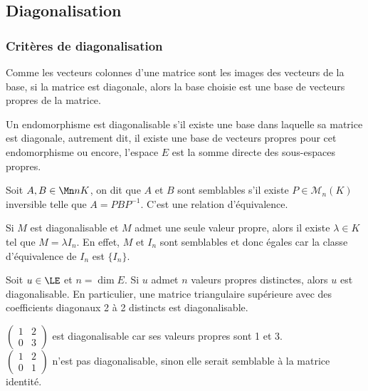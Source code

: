 \subsection{Diagonalisation}

\subsubsection{Critères de diagonalisation}

\begin{remarque}
	Comme les vecteurs colonnes d'une matrice sont les images des vecteurs de
	la base, si la matrice est diagonale, alors la base choisie est une base de
	vecteurs propres de la matrice.
\end{remarque}


\begin{definition}
	Un endomorphisme est diagonalisable s'il existe une base dans laquelle sa matrice est diagonale, autrement dit, il
	existe une base de vecteurs propres pour cet endomorphisme ou encore, l'espace $E$ est la somme directe des sous-espaces propres.
\end{definition}

\begin{rappel}
	Soit $A, B \in \Mn n K$, on dit que $A$ et $B$ sont semblables s'il existe
	$P \in \mathcal{M}_n(K)$ inversible telle que $A = PBP^{-1}$. C'est une relation d'équivalence.
\end{rappel}

\begin{exemple}
	Si $M$ est diagonalisable et $M$ admet une seule valeur propre, alors il existe $\lambda \in K$ tel que $M = \lambda I_n$.
	En effet, $M$ et $I_n$ sont semblables et donc égales car la classe d'équivalence de $I_n$ est $\{I_n\}$.
\end{exemple}



\begin{prop}
	Soit $u \in \LE$ et $n = \dim E$. Si $u$ admet $n$ valeurs propres distinctes, alors $u$ est diagonalisable.
	En particulier, une matrice triangulaire supérieure avec des coefficients diagonaux 2 à 2 distincts est diagonalisable.
\end{prop}

\begin{exemple}
	$ \begin{pmatrix}
			1 & 2 \\
			0 & 3
		\end{pmatrix} $ est diagonalisable car ses valeurs propres sont 1 et 3.\\
	$\begin{pmatrix}
			1 & 2 \\ 0 & 1
		\end{pmatrix} $ n'est pas diagonalisable, sinon elle serait semblable à la matrice identité.
\end{exemple}

